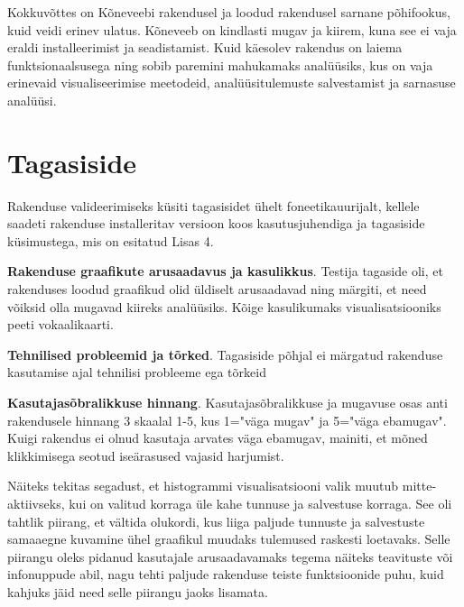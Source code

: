 Kokkuvõttes on Kõneveebi rakendusel ja loodud rakendusel sarnane põhifookus, kuid veidi erinev ulatus. Kõneveeb on kindlasti mugav ja kiirem, kuna see ei vaja eraldi installeerimist ja seadistamist. Kuid käesolev rakendus on laiema funktsionaalsusega ning sobib paremini mahukamaks analüüsiks, kus on vaja erinevaid visualiseerimise meetodeid, analüüsitulemuste salvestamist ja sarnasuse analüüsi.

\section{Tagasiside}
Rakenduse valideerimiseks küsiti tagasisidet ühelt foneetikauurijalt, kellele saadeti rakenduse installeritav versioon koos kasutusjuhendiga ja tagasiside küsimustega, mis on esitatud Lisas 4.

\textbf{Rakenduse graafikute arusaadavus ja kasulikkus}. Testija tagaside oli, et rakenduses loodud graafikud olid üldiselt arusaadavad ning märgiti, et need võiksid olla mugavad kiireks analüüsiks. Kõige kasulikumaks visualisatsiooniks peeti vokaalikaarti.

\textbf{Tehnilised probleemid ja tõrked}.
Tagasiside põhjal ei märgatud rakenduse kasutamise ajal tehnilisi probleeme ega tõrkeid

\textbf{Kasutajasõbralikkuse hinnang}.
Kasutajasõbralikkuse ja mugavuse osas anti rakendusele hinnang 3 skaalal 1-5, kus 1="väga mugav" ja 5="väga ebamugav". Kuigi rakendus ei olnud kasutaja arvates väga ebamugav, mainiti, et mõned klikkimisega seotud iseärasused vajasid harjumist.

Näiteks tekitas segadust, et histogrammi visualisatsiooni valik muutub mitte-aktiivseks, kui on valitud korraga üle kahe tunnuse ja salvestuse korraga. See oli tahtlik piirang, et vältida olukordi, kus liiga paljude tunnuste ja salvestuste samaaegne kuvamine ühel graafikul muudaks tulemused raskesti loetavaks. Selle piirangu oleks pidanud kasutajale arusaadavamaks tegema näiteks teavituste või infonuppude abil, nagu tehti paljude rakenduse teiste funktsioonide puhu, kuid kahjuks jäid need selle piirangu jaoks lisamata.


